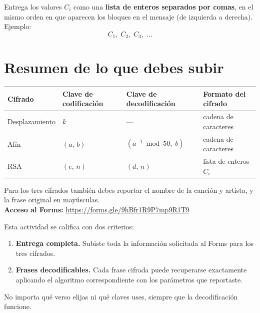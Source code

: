 \documentclass[12pt, oneside]{article}
\begin{document}
Entrega los valores $C_i$ como una \textbf{lista de enteros separados
por comas}, en el mismo orden en que aparecen los bloques en el
mensaje (de izquierda a derecha).  Ejemplo:
\[
  C_1,\; C_2,\; C_3,\; \ldots
\]

\newpage
\section{Resumen de lo que debes subir}

\begin{center}
\renewcommand{\arraystretch}{1.4}
\begin{tabular}{llll}
\toprule
\textbf{Cifrado} & \textbf{Clave de codificación} &
\textbf{Clave de decodificación} & \textbf{Formato del cifrado} \\
\midrule
Desplazamiento & $k$ & —        & cadena de caracteres \\
Afín    & $(a,\, b)$ & $(a^{-1} \bmod 50,\; b)$ & cadena de caracteres \\
RSA     & $(e,\, n)$ & $(d,\, n)$ & lista de enteros $C_i$ \\
\bottomrule
\end{tabular}
\end{center}

Para los tres cifrados también debes reportar el nombre de la
canción y artista, y la frase original en mayúsculas.\\[8pt]

\noindent\textbf{Acceso al Forms:}\quad
\url{https://forms.gle/9hBfr1R9P7mp9R1T9}

\bigskip

\begin{recuerda}[Calificación]
  Esta actividad se califica con dos criterios:
  \begin{enumerate}
    \item \textbf{Entrega completa.}  Subiste toda la información
          solicitada al Forms para los tres cifrados.
    \item \textbf{Frases decodificables.}  Cada frase cifrada puede
          recuperarse exactamente aplicando el algoritmo correspondiente
          con los parámetros que reportaste.
  \end{enumerate}
  No importa qué verso elijas ni qué claves uses, siempre que la
  decodificación funcione.
\end{recuerda}
\end{document}
